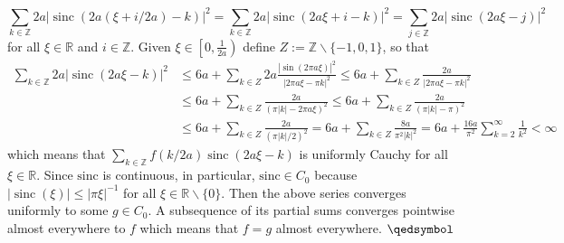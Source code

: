 \documentclass[lang=en,11pt,a4paper,citestyle =authoryear]{elegantpaper}
\newcommand{\prvd}{$\hfill \qedsymbol$}
\begin{document}
\[
\sum_{k \in \mathbb{Z}} 2 a|\operatorname{sinc}(2 a(\xi+i / 2 a)-k)|^{2}=\sum_{k \in \mathbb{Z}} 2 a|\operatorname{sinc}(2 a \xi+i-k)|^{2}=\sum_{j \in \mathbb{Z}} 2 a|\operatorname{sinc}(2 a \xi-j)|^{2}
\]
for all $\xi \in \mathbb{R}$ and $i \in \mathbb{Z}$. Given $\xi \in\left[0, \frac{1}{2 a}\right)$ define $Z:=\mathbb{Z} \backslash\{-1,0,1\}$, so that
\[
\begin{aligned}
\sum_{k \in \mathbb{Z}} 2 a|\operatorname{sinc}(2 a \xi-k)|^{2} & \leq 6 a+\sum_{k \in Z} 2 a \frac{|\sin (2 \pi a \xi)|^{2}}{|2 \pi a \xi-\pi k|^{2}} 
 \leq 6 a+\sum_{k \in Z} \frac{2 a}{|2 \pi a \xi-\pi k|^{2}} \\ & \leq 6 a+\sum_{k \in Z} \frac{2 a}{(\pi|k|-2 \pi a \xi)^{2}} \leq 6 a+\sum_{k \in Z} \frac{2 a}{(\pi|k|-\pi)^{2}}  \\&\leq 6 a+\sum_{k \in Z} \frac{2 a}{(\pi|k| / 2)^{2}} =6 a+\sum_{k \in Z} \frac{8 a}{\pi^{2}|k|^{2}}  =6 a+\frac{16 a}{\pi^{2}} \sum_{k=2}^{\infty} \frac{1}{k^{2}} <\infty 
\end{aligned}
\]
which means that $\sum_{k \in \mathbb{Z}} f(k / 2 a) \operatorname{sinc}(2 a \xi-k)$ is uniformly Cauchy for all $\xi \in \mathbb{R}$. Since $\text{sinc}$ is continuous, in particular,  $\text{sinc}\in C_{0}$ because $|\operatorname{sinc}(\xi)| \leq|\pi \xi|^{-1}$ for all $\xi \in \mathbb{R} \backslash\{0\}$. Then the above series converges uniformly to some $g \in C_{0}$. A subsequence of its partial sums converges pointwise almost everywhere to $f$ which means that $f=g$ almost everywhere.
\prvd
\vspace{0.5em}
\end{document}
